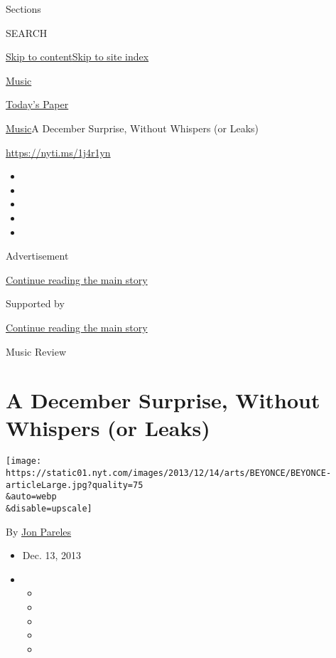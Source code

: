 Sections

SEARCH

\protect\hyperlink{site-content}{Skip to
content}\protect\hyperlink{site-index}{Skip to site index}

\href{https://www.nytimes.com/section/arts/music}{Music}

\href{https://myaccount.nytimes.com/auth/login?response_type=cookie\&client_id=vi}{}

\href{https://www.nytimes.com/section/todayspaper}{Today's Paper}

\href{/section/arts/music}{Music}\textbar{}A December Surprise, Without
Whispers (or Leaks)

\url{https://nyti.ms/1j4r1yn}

\begin{itemize}
\item
\item
\item
\item
\item
\end{itemize}

Advertisement

\protect\hyperlink{after-top}{Continue reading the main story}

Supported by

\protect\hyperlink{after-sponsor}{Continue reading the main story}

Music Review

\hypertarget{a-december-surprise-without-whispers-or-leaks}{%
\section{A December Surprise, Without Whispers (or
Leaks)}\label{a-december-surprise-without-whispers-or-leaks}}

\texttt{[image: https://static01.nyt.com/images/2013/12/14/arts/BEYONCE/BEYONCE-articleLarge.jpg?quality=75\\\&auto=webp\\\&disable=upscale]}

By \href{https://www.nytimes.com/by/jon-pareles}{Jon Pareles}

\begin{itemize}
\item
  Dec. 13, 2013
\item
  \begin{itemize}
  \item
  \item
  \item
  \item
  \item
  \end{itemize}
\end{itemize}

